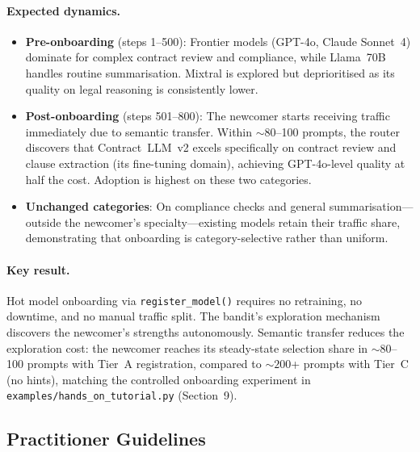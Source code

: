 \paragraph{Expected dynamics.}

\begin{itemize}[nosep,leftmargin=*]
    \item \textbf{Pre-onboarding} (steps 1--500): Frontier models (GPT-4o, Claude Sonnet~4) dominate for complex contract review and compliance, while Llama~70B handles routine summarisation.  Mixtral is explored but deprioritised as its quality on legal reasoning is consistently lower.

    \item \textbf{Post-onboarding} (steps 501--800): The newcomer starts receiving traffic immediately due to semantic transfer.  Within ${\sim}80$--100 prompts, the router discovers that Contract~LLM~v2 excels specifically on contract review and clause extraction (its fine-tuning domain), achieving GPT-4o-level quality at half the cost.  Adoption is highest on these two categories.

    \item \textbf{Unchanged categories}: On compliance checks and general summarisation---outside the newcomer's specialty---existing models retain their traffic share, demonstrating that onboarding is category-selective rather than uniform.
\end{itemize}

\paragraph{Key result.}
Hot model onboarding via \texttt{register\_model()} requires no retraining, no downtime, and no manual traffic split.  The bandit's exploration mechanism discovers the newcomer's strengths autonomously.  Semantic transfer reduces the exploration cost: the newcomer reaches its steady-state selection share in ${\sim}80$--100 prompts with Tier~A registration, compared to ${\sim}200$+ prompts with Tier~C (no hints), matching the controlled onboarding experiment in \texttt{examples/hands\_on\_tutorial.py} (Section~9).


\subsection{Practitioner Guidelines}
\label{app:practitioner_guidelines}

